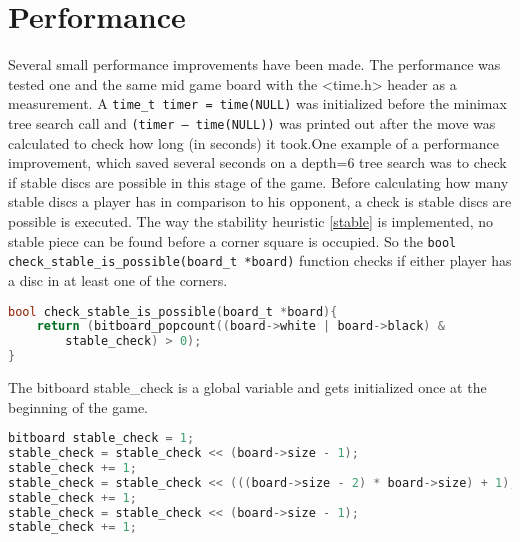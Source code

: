 \section{Performance}
Several small performance improvements have been made. The performance was tested one and the same mid game board with the <time.h> header as a measurement. A \verb|time_t timer = time(NULL)| was initialized before the minimax tree search call and \verb|(timer – time(NULL))| was printed out after the move was calculated to check how long (in seconds) it took.\newline One example of a performance improvement, which saved several seconds on a depth=6 tree search was to check if stable discs are possible in this stage of the game. Before calculating how many stable discs a player has in comparison to his opponent, a check is stable discs are possible is executed. The way the stability heuristic \ref{stable} is implemented, no stable piece can be found before a corner square is occupied. So the \verb|bool check_stable_is_possible(board_t *board)| function checks if either player has a disc in at least one of the corners.
\begin{lstlisting}[language=c]
bool check_stable_is_possible(board_t *board){
	return (bitboard_popcount((board->white | board->black) & 
		stable_check) > 0);
}
\end{lstlisting}
The bitboard stable\_check is a global variable and gets initialized once at the beginning of the game.
\begin{lstlisting}[language=c]
bitboard stable_check = 1;
stable_check = stable_check << (board->size - 1);
stable_check += 1;
stable_check = stable_check << (((board->size - 2) * board->size) + 1);
stable_check += 1;
stable_check = stable_check << (board->size - 1);
stable_check += 1;
\end{lstlisting}